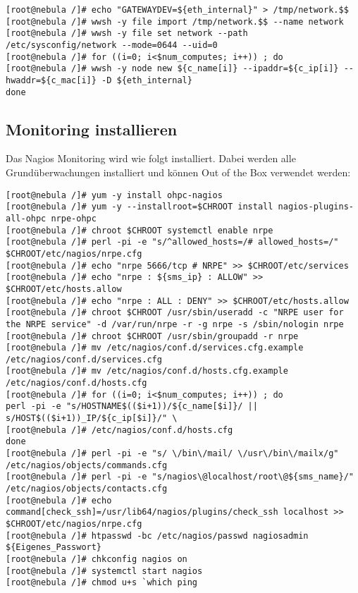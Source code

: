 \begin{lstlisting}
[root@nebula /]# echo "GATEWAYDEV=${eth_internal}" > /tmp/network.$$
[root@nebula /]# wwsh -y file import /tmp/network.$$ --name network
[root@nebula /]# wwsh -y file set network --path /etc/sysconfig/network --mode=0644 --uid=0
[root@nebula /]# for ((i=0; i<$num_computes; i++)) ; do
[root@nebula /]# wwsh -y node new ${c_name[i]} --ipaddr=${c_ip[i]} --hwaddr=${c_mac[i]} -D ${eth_internal}
done
\end{lstlisting}
\newpage
\subsection{Monitoring installieren}

Das Nagios Monitoring wird wie folgt installiert. Dabei werden alle Grundüberwachungen installiert und können Out of the Box verwendet werden:

\begin{lstlisting}
[root@nebula /]# yum -y install ohpc-nagios
[root@nebula /]# yum -y --installroot=$CHROOT install nagios-plugins-all-ohpc nrpe-ohpc
[root@nebula /]# chroot $CHROOT systemctl enable nrpe
[root@nebula /]# perl -pi -e "s/^allowed_hosts=/# allowed_hosts=/" $CHROOT/etc/nagios/nrpe.cfg
[root@nebula /]# echo "nrpe 5666/tcp # NRPE" >> $CHROOT/etc/services
[root@nebula /]# echo "nrpe : ${sms_ip} : ALLOW" >> $CHROOT/etc/hosts.allow
[root@nebula /]# echo "nrpe : ALL : DENY" >> $CHROOT/etc/hosts.allow
[root@nebula /]# chroot $CHROOT /usr/sbin/useradd -c "NRPE user for the NRPE service" -d /var/run/nrpe -r -g nrpe -s /sbin/nologin nrpe
[root@nebula /]# chroot $CHROOT /usr/sbin/groupadd -r nrpe
[root@nebula /]# mv /etc/nagios/conf.d/services.cfg.example /etc/nagios/conf.d/services.cfg
[root@nebula /]# mv /etc/nagios/conf.d/hosts.cfg.example /etc/nagios/conf.d/hosts.cfg
[root@nebula /]# for ((i=0; i<$num_computes; i++)) ; do
perl -pi -e "s/HOSTNAME$(($i+1))/${c_name[$i]}/ || s/HOST$(($i+1))_IP/${c_ip[$i]}/" \
[root@nebula /]# /etc/nagios/conf.d/hosts.cfg
done
[root@nebula /]# perl -pi -e "s/ \/bin\/mail/ \/usr\/bin\/mailx/g" /etc/nagios/objects/commands.cfg
[root@nebula /]# perl -pi -e "s/nagios\@localhost/root\@${sms_name}/" /etc/nagios/objects/contacts.cfg
[root@nebula /]# echo command[check_ssh]=/usr/lib64/nagios/plugins/check_ssh localhost >> $CHROOT/etc/nagios/nrpe.cfg
[root@nebula /]# htpasswd -bc /etc/nagios/passwd nagiosadmin ${Eigenes_Passwort}
[root@nebula /]# chkconfig nagios on
[root@nebula /]# systemctl start nagios
[root@nebula /]# chmod u+s `which ping
\end{lstlisting}

